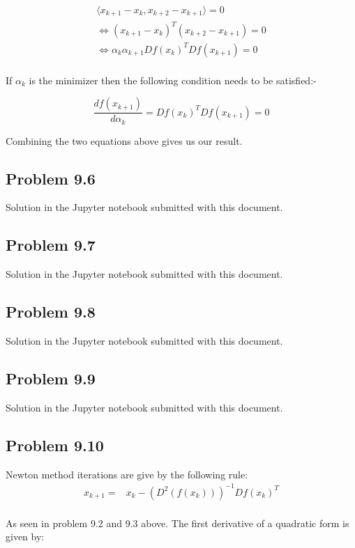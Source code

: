\documentclass[letterpaper,12pt]{article}
\theoremstyle{definition}
\begin{document}
\begin{align*}
    \langle x_{k+1} -x_k,x_{k+2} -x_{k+1}\rangle = 0\\
    \iff (x_{k+1} -x_k)^T(x_{k+2} -x_{k+1}) = 0\\
    \iff \alpha_k \alpha_{k+1}Df(x_k)^TDf(x_{k+1})= 0\\
\end{align*}

\begin{flushleft}
If $\alpha_k$ is the minimizer then the following condition needs to be satisfied:-
\end{flushleft}
\begin{equation*}
    \frac{d f(x_{k+1}) }{d \alpha_k}  = Df(x_k)^TDf(x_{k+1}) = 0 
\end{equation*}

\begin{flushleft}
Combining the two equations above gives us our result.
\end{flushleft}


\subsection*{Problem 9.6}


Solution in the Jupyter notebook submitted with this document.
\subsection*{Problem 9.7}
Solution in the Jupyter notebook submitted with this document.
\subsection*{Problem 9.8}
Solution in the Jupyter notebook submitted with this document.
\subsection*{Problem 9.9}
Solution in the Jupyter notebook submitted with this document.
\subsection*{Problem 9.10}
Newton method iterations are give by the following rule:
\begin{align*}
   x_{k+1}=& x_{k} - (D^2 (f(x_{k})))^{-1} Df(x_{k})^T \\
\end{align*}
\begin{flushleft}
As seen in problem 9.2 and 9.3 above. The first derivative of a quadratic form is given by:
\end{flushleft}
\end{document}
